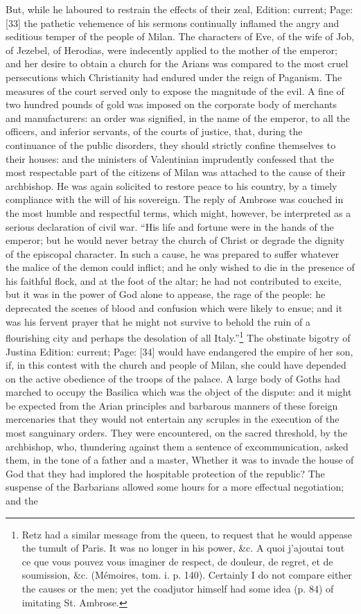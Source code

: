 But, while he laboured to restrain the effects of their zeal, Edition: current; Page: [33] the pathetic vehemence of his sermons continually inflamed the angry and seditious temper of the people of Milan. The characters of Eve, of the wife of Job, of Jezebel, of Herodias, were indecently applied to the mother of the emperor; and her desire to obtain a church for the Arians was compared to the most cruel persecutions which Christianity had endured under the reign of Paganism. The measures of the court served only to expose the magnitude of the evil. A fine of two hundred pounds of gold was imposed on the corporate body of merchants and manufacturers: an order was signified, in the name of the emperor, to all the officers, and inferior servants, of the courts of justice, that, during the continuance of the public disorders, they should strictly confine themselves to their houses: and the ministers of Valentinian imprudently confessed that the most respectable part of the citizens of Milan was attached to the cause of their archbishop. He was again solicited to restore peace to his country, by a timely compliance with the will of his sovereign. The reply of Ambrose was couched in the most humble and respectful terms, which might, however, be interpreted as a serious declaration of civil war. \texthebrew{“}His life and fortune were in the hands of the emperor; but he would never betray the church of Christ or degrade the dignity of the episcopal character. In such a cause, he was prepared to suffer whatever the malice of the demon could inflict; and he only wished to die in the presence of his faithful flock, and at the foot of the altar; he had not contributed to excite, but it was in the power of God alone to appease, the rage of the people: he deprecated the scenes of blood and confusion which were likely to ensue; and it was his fervent prayer that he might not survive to behold the ruin of a flourishing city and perhaps the desolation of all Italy.\texthebrew{}”\footnote{Retz had a similar message from the queen, to request that he would appease the tumult of Paris. It was no longer in his power, \&c. A quoi j\texthebrew{}’ajoutai tout ce que vous pouvez vous imaginer de respect, de douleur, de regret, et de soumission, \&c. (Mémoires, tom. i. p. 140). Certainly I do not compare either the causes or the men; yet the coadjutor himself had some idea (p. 84) of imitating St. Ambrose.} The obstinate bigotry of Justina Edition: current; Page: [34] would have endangered the empire of her son, if, in this contest with the church and people of Milan, she could have depended on the active obedience of the troops of the palace. A large body of Goths had marched to occupy the Basilica which was the object of the dispute: and it might be expected from the Arian principles and barbarous manners of these foreign mercenaries that they would not entertain any scruples in the execution of the most sanguinary orders. They were encountered, on the sacred threshold, by the archbishop, who, thundering against them a sentence of excommunication, asked them, in the tone of a father and a master, Whether it was to invade the house of God that they had implored the hospitable protection of the republic? The suspense of the Barbarians allowed some hours for a more effectual negotiation; and the 